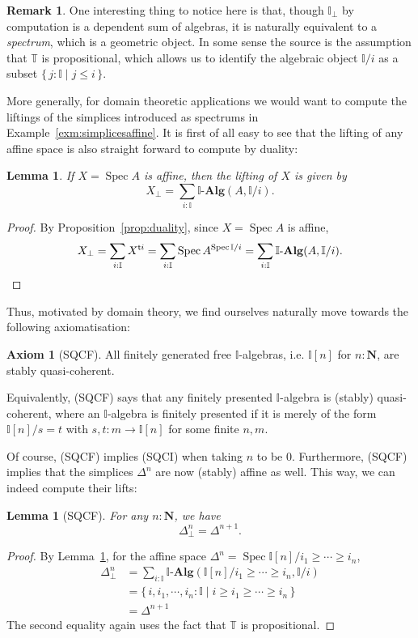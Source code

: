 \documentclass[12pt]{amsart}
\newtheorem{lemma}[theorem]{Lemma}
\theoremstyle{definition}
\newtheorem{remark}[theorem]{Remark}
\newtheorem{axiom}{Axiom}
\newcommand{\mb}[1]{\mathbf{#1}}
\newcommand{\mbb}[1]{\mathbb{#1}}
\newcommand{\T}{\mbb T}
\newcommand{\I}{\mbb I}
\newcommand{\ms}[1]{\mathsf{#1}}
\newcommand{\alg}{\text{-}\mb{Alg}}
\newcommand{\scomp}[2]{\{\,#1\mid#2\,\}}
\newcommand{\N}{\mb N}
\newcommand{\prt}{_{\bot}}
\newcommand{\spec}{\operatorname{Spec}}
\begin{document}
\begin{remark}
  One interesting thing to notice here is that, though $\I\prt$ by computation is a dependent sum of algebras, it is naturally equivalent to a \emph{spectrum}, which is a geometric object. In some sense the source is the assumption that $\T$ is propositional, which allows us to identify the algebraic object $\I/i$ as a subset $\scomp{j : \I}{j \le i}$.
\end{remark}


More generally, for domain theoretic applications we would want to compute the liftings of the simplices introduced as spectrums in Example~\ref{exm:simplicesaffine}. It is first of all easy to see that the lifting of any affine space is also straight forward to compute by duality:

\begin{lemma}\label{lem:liftofaffine}
  If $X = \spec A$ is affine, then the lifting of $X$ is given by
  \[ X\prt = \sum_{i:\I}\I\alg(A,\I/i). \]
\end{lemma}
\begin{proof}
  By Proposition~\ref{prop:duality}, since $X = \spec A$ is affine,
  \[ X\prt = \sum_{i:\I}X^{\ms ti} = \sum_{i:\I}\spec A^{\spec \I/i} = \sum_{i:\I}\I\alg(A,\I/i). \qedhere \]
\end{proof}

Thus, motivated by domain theory, we find ourselves naturally move towards the following axiomatisation:

\begin{axiom}[SQCF]
  All finitely generated free $\I$-algebras, i.e. $\I[n]$ for $n : \N$, are stably quasi-coherent.
\end{axiom}

Equivalently, (SQCF) says that any finitely presented $\I$-algebra is (stably) quasi-coherent, where an $\I$-algebra is finitely presented if it is merely of the form $\I[n]/s=t$ with $s,t : m \to \I[n]$ for some finite $n,m$.

Of course, (SQCF) implies (SQCI) when taking $n$ to be 0. Furthermore, (SQCF) implies that the simplices $\Delta^n$ are now (stably) affine as well. This way, we can indeed compute their lifts:

\begin{lemma}[SQCF]
  For any $n : \N$, we have
  \[ \Delta^n\prt = \Delta^{n+1}. \]
\end{lemma}
\begin{proof}
  By Lemma~\ref{lem:liftofaffine}, for the affine space $\Delta^n = \spec\I[n]/i_1 \ge \cdots \ge i_n$,
  \begin{align*}
    \Delta^n\prt 
    &= \sum_{i:\I}\I\alg(\I[n]/i_1\ge\cdots\ge i_n,\I/i) \\
    &= \scomp{i,i_1,\cdots,i_n:\I}{i \ge i_1 \ge \cdots \ge i_n} \\
    &= \Delta^{n+1}
  \end{align*}
  The second equality again uses the fact that $\T$ is propositional.
\end{proof}
\end{document}
